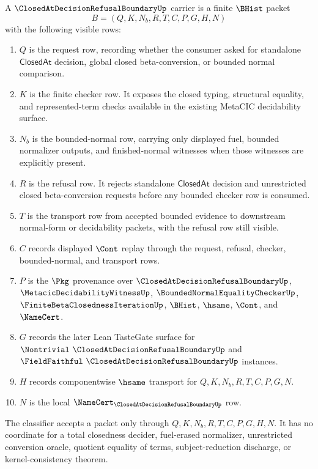 \begin{definition}
\label{def:closedat-decision-refusal-boundary-carrier}
A $\ClosedAtDecisionRefusalBoundaryUp$ carrier is a finite $\BHist$ packet
$$
B=(Q,K,N_b,R,T,C,P,G,H,N)
$$
with the following visible rows:
\begin{enumerate}
\item $Q$ is the request row, recording whether the consumer asked for standalone $\mathsf{ClosedAt}$ decision, global closed beta-conversion, or bounded normal comparison.
\item $K$ is the finite checker row. It exposes the closed typing, structural equality, and represented-term checks available in the existing MetaCIC decidability surface.
\item $N_b$ is the bounded-normal row, carrying only displayed fuel, bounded normalizer outputs, and finished-normal witnesses when those witnesses are explicitly present.
\item $R$ is the refusal row. It rejects standalone $\mathsf{ClosedAt}$ decision and unrestricted closed beta-conversion requests before any bounded checker row is consumed.
\item $T$ is the transport row from accepted bounded evidence to downstream normal-form or decidability packets, with the refusal row still visible.
\item $C$ records displayed $\Cont$ replay through the request, refusal, checker, bounded-normal, and transport rows.
\item $P$ is the $\Pkg$ provenance over $\ClosedAtDecisionRefusalBoundaryUp$, $\MetacicDecidabilityWitnessUp$, $\BoundedNormalEqualityCheckerUp$, $\FiniteBetaClosednessIterationUp$, $\BHist$, $\hsame$, $\Cont$, and $\NameCert$.
\item $G$ records the later Lean TasteGate surface for $\Nontrivial\ \ClosedAtDecisionRefusalBoundaryUp$ and $\FieldFaithful\ \ClosedAtDecisionRefusalBoundaryUp$ instances.
\item $H$ records componentwise $\hsame$ transport for $Q,K,N_b,R,T,C,P,G,N$.
\item $N$ is the local $\NameCert_{\ClosedAtDecisionRefusalBoundaryUp}$ row.
\end{enumerate}
The classifier accepts a packet only through $Q,K,N_b,R,T,C,P,G,H,N$. It has no coordinate for a total closedness decider, fuel-erased normalizer, unrestricted conversion oracle, quotient equality of terms, subject-reduction discharge, or kernel-consistency theorem.
\end{definition}

